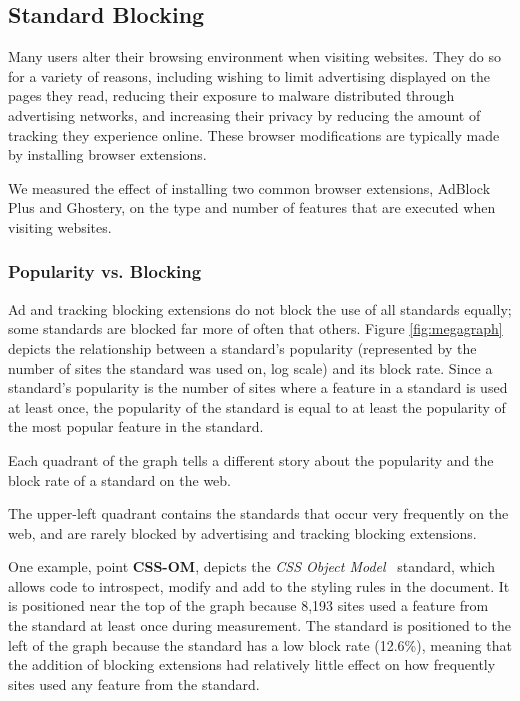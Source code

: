 \subsection{Standard Blocking} \label{sec:results-feature-blocking} Many users
alter their browsing environment when visiting websites.  They do so for a
variety of reasons, including wishing to limit advertising displayed on the
pages they read, reducing their exposure to malware distributed through
advertising networks, and increasing their privacy by reducing the amount of
tracking they experience online.  These browser modifications are typically
made by installing browser extensions.

We measured the effect of installing two common browser extensions, AdBlock
Plus and Ghostery, on the type and number of features that are executed when
visiting websites.

\subsubsection{Popularity vs. Blocking} \label{sec:results-feature-popularity}



Ad and tracking blocking extensions do not block the use of all standards
equally; some standards are blocked far more of often that others.  Figure
\ref{fig:megagraph} depicts the relationship between a standard's popularity
(represented by the number of sites the standard was used on, log scale) and
its block rate.  Since a standard's popularity is the number of sites where a
feature in a standard is used at least once, the popularity of the standard is
equal to at least the popularity of the most popular feature in the standard.

Each quadrant of the graph tells a different story about the popularity and the
block rate of a standard on the web.

 The upper-left quadrant
contains the standards that occur very frequently on the web, and are rarely
blocked by advertising and tracking blocking extensions.

One example, point \textbf{CSS-OM}, depicts the \textit{CSS Object
Model}~\cite{cssomw3c} standard, which allows \JS code to introspect, modify
and add to the styling rules in the document.  It is positioned near the top of
the graph because 8,193 sites used a feature from the standard at least once
during measurement.  The standard is positioned to the left of the graph
because the standard has a low block rate (12.6\%), meaning that the addition
of blocking extensions had relatively little effect on how frequently sites
used any feature from the standard.

